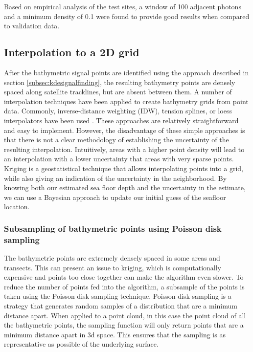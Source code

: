 Based on empirical analysis of the test sites, a window of 100 adjacent photons and a minimum density of 0.1 were found to provide good results when compared to validation data.

\subsection{Interpolation to a 2D grid}\label{subec:gridding}

After the bathymetric signal points are identified using the approach described in section \ref{subsec:kdesignalfinding}, the resulting bathymetry points are densely spaced along satellite tracklines, but are absent between them. A number of interpolation techniques have been applied to create bathymetry grids from point data. Commonly, inverse-distance weighting (IDW), tension splines, or loess interpolators have been used \parencite{gebcocookbook,Ferreira2017}. These approaches are relatively straightforward and easy to implement. However, the disadvantage of these simple approaches is that there is not a clear methodology of establishing the uncertainty of the resulting interpolation. Intuitively, areas with a higher point density will lead to an interpolation with a lower uncertainty that areas with very sparse points. Kriging is a geostatistical technique that allows interpolating points into a grid, while also giving an indication of the uncertainty in the neighborhood. By knowing both our estimated sea floor depth and the uncertainty in the estimate, we can use a Bayesian approach to update our initial guess of the seafloor location.


\subsubsection{Subsampling of bathymetric points using Poisson disk sampling} \label{subsec:poissonsubsampling}
The bathymetric points are extremely densely spaced in some areas and transects. This can present an issue to kriging, which is computationally expensive and points too close together can make the algorithm even slower. To reduce the number of points fed into the algorithm, a subsample of the points is taken using the Poisson disk sampling technique. Poisson disk sampling is a strategy that generates random samples of a distribution that are a minimum distance apart. When applied to a point cloud, in this case the point cloud of all the bathymetric points, the sampling function will only return points that are a minimum distance apart in 3d space. This ensures that the sampling is as representative as possible of the underlying surface.

